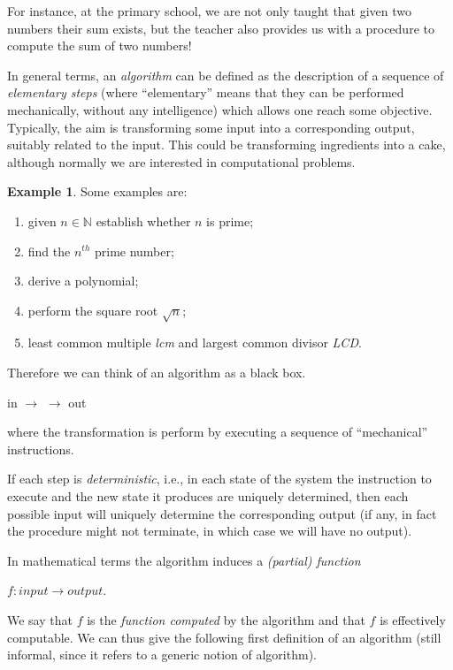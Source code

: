 \documentclass{amsbook}
\newcommand{\nat}{\ensuremath{\mathbb{N}}}
\theoremstyle{definition}
\newtheorem{example}[theorem]{Example}
\theoremstyle{remark}
\numberwithin{section}{chapter}
\numberwithin{equation}{chapter}
\begin{document}
For instance, at the primary school, we are not only taught that given
two numbers their sum exists, but the teacher also provides us with a
procedure to compute the sum of two numbers!

In general terms, an \emph{algorithm} can be defined as the
description of a sequence of \emph{elementary steps} (where
``elementary'' means that they can be performed mechanically, without
any intelligence) which allows one reach some objective.  Typically,
the aim is transforming some input into a corresponding output,
suitably related to the input.
%
This could be transforming ingredients into a cake, although normally
we are interested in computational problems.

\begin{example}
  Some examples are:
  \begin{enumerate}
    
  \item given $n \in \nat$ establish whether $n$ is prime;
  \item find the $n^{th}$ prime number;
  \item derive a polynomial;
  \item perform the square root $\sqrt{n}$;
  \item least common multiple \emph{lcm} and largest common divisor \emph{LCD}.
  \end{enumerate}
\end{example}

Therefore we can think of an algorithm as a black box.
\begin{center}
  in $\rightarrow$  $\rightarrow$ out
\end{center}
where the transformation is perform by executing a sequence of
``mechanical'' instructions.

If each step is \emph{deterministic}, i.e., in each state of the
system the instruction to execute and the new state it produces are
uniquely determined, then each possible input will uniquely determine
the corresponding output (if any, in fact the procedure might not
terminate, in which case we will have no output).

In mathematical terms the algorithm induces a \emph{(partial) function}
\begin{center}
  $f : \mathit{input} \rightarrow \mathit{output}$.
\end{center}
We say that $f$ is the \emph{function computed} by the algorithm and
that $f$ is effectively computable. We can thus give the following
first definition of an algorithm (still informal, since it refers to a
generic notion of algorithm).
\end{document}
